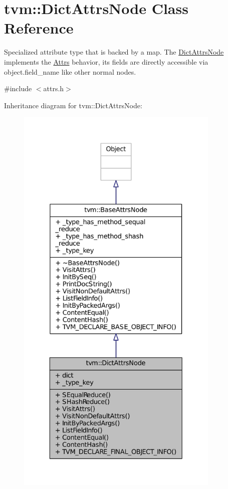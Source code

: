 \hypertarget{classtvm_1_1DictAttrsNode}{}\section{tvm\+:\+:Dict\+Attrs\+Node Class Reference}
\label{classtvm_1_1DictAttrsNode}


Specialized attribute type that is backed by a map. The \hyperlink{classtvm_1_1DictAttrsNode}{Dict\+Attrs\+Node} implements the \hyperlink{classtvm_1_1Attrs}{Attrs} behavior, its fields are directly accessible via object.\+field\+\_\+name like other normal nodes.  




{\ttfamily \#include $<$attrs.\+h$>$}



Inheritance diagram for tvm\+:\+:Dict\+Attrs\+Node\+:
\nopagebreak
\begin{figure}[H]
\begin{center}
\leavevmode
\includegraphics[height=550pt]{classtvm_1_1DictAttrsNode__inherit__graph}
\end{center}
\end{figure}


